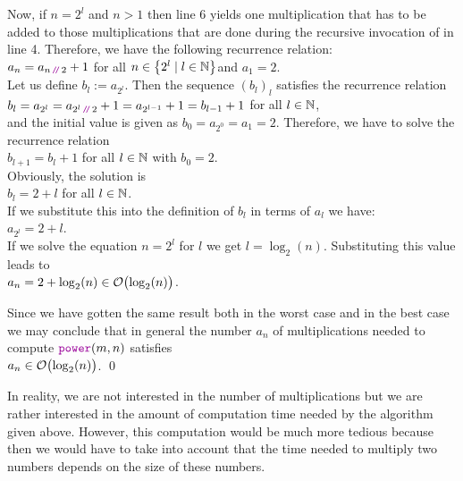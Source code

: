 Now, if $n = 2^l$ and $n > 1$ then line 6 yields one multiplication that 
has to be added to those multiplications that are done during the recursive invocation of
 in line 4.  Therefore, we have the following recurrence relation:
 \\[0.2cm]
\hspace*{1.3cm} $a_n = a_{n \dvv 2} + 1$ \qquad for all $n \in \left\{2^l \mid l \in {\mathbb N}\right\}$\quad and
$a_1 = 2$. 
\\[0.2cm]
Let us define $b_l := a_{2^l}$.  Then the sequence $(b_l)_l$ satisfies the recurrence relation
 \\[0.2cm]
\hspace*{1.3cm} 
$b_l = a_{2^l} = a_{2^l \dvv 2} + 1 = a_{2^{l-1}} + 1 = b_{l-1} + 1$ \qquad for all $l\in{\mathbb N}$, \\[0.2cm]
and the initial value is given as $b_0 = a_{2^0} = a_1 = 2$.
Therefore, we have to solve the recurrence relation 
\\[0.2cm]
\hspace*{1.3cm}
 $b_{l+1} = b_l + 1$ \qquad for all $l \in {\mathbb N}$ \quad with $b_0 = 2$.\\[0.2cm]
Obviously, the solution is \\[0.2cm]
\hspace*{1.3cm} $b_l = 2 + l$ \qquad for all $l\in{\mathbb N}$.
\\[0.2cm]
If we substitute this into the definition of $b_l$ in terms of $a_l$ we have: \\[0.2cm]
\hspace*{1.3cm}
$a_{2^l} = 2 + l$. 
\\[0.2cm]
If we solve the equation $n = 2^l$ for  $l$ we get $l =
\log_2(n)$. Substituting this value leads to
\\[0.2cm]
\hspace*{1.3cm}
 $a_n = 2 + \log_2(n) \in \mathcal{O}\bigl(\log_2(n)\bigr)$.
\vspace*{0.3cm}

Since we have gotten the same result both in the worst case and in the best case we may conclude
that in general the number $a_n$ of multiplications needed to compute $\mytt{power}(m, n)$ satisfies 
\\[0.2cm]
\hspace*{1.3cm} 
$a_n \in \mathcal{O}\bigl(\log_2(n)\bigr)$. \qed

\remark
In reality, we are not interested in the number of multiplications but we are rather interested
in the amount of computation time needed by the algorithm given above.
However, this computation would be much more tedious because then we would have to take into account
that the time needed to multiply two numbers depends on the size of these numbers.

